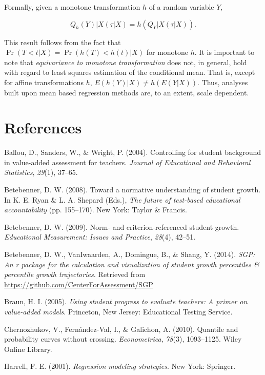 \documentclass[12pt]{article}
\begin{document}
Formally, given a monotone transformation \(h\) of a random variable
\(Y\),

\begin{equation} Q_ h(Y)|X (\tau | X) = h(Q_ Y|X (\tau | X)).\end{equation}

This result follows from the fact that
\(\Pr (T < t | X) = \Pr (h(T) < h(t) | X)\) for monotone \(h\). It is
important to note that \emph{equivariance to monotone transformation}
does not, in general, hold with regard to least squares estimation of
the conditional mean. That is, except for affine transformations \(h\),
\(E(h(Y)|X) \not= h(E(Y|X))\). Thus, analyses built upon mean based
regression methods are, to an extent, scale dependent.

\pagebreak

\section*{References}\label{references}

Ballou, D., Sanders, W., \& Wright, P. (2004). Controlling for student
background in value-added assessment for teachers. \emph{Journal of
Educational and Behavioral Statistics}, \emph{29}(1), 37--65.

Betebenner, D. W. (2008). Toward a normative understanding of student
growth. In K. E. Ryan \& L. A. Shepard (Eds.), \emph{The future of
test-based educational accountability} (pp. 155--170). New York: Taylor
\& Francis.

Betebenner, D. W. (2009). Norm- and criterion-referenced student growth.
\emph{Educational Measurement: Issues and Practice}, \emph{28}(4),
42--51.

Betebenner, D. W., {VanIwaarden}, A., Domingue, B., \& Shang, Y. (2014).
\emph{SGP: An r package for the calculation and visualization of student
growth percentiles \& percentile growth trajectories.} Retrieved from
\url{https://github.com/CenterForAssessment/SGP}

Braun, H. I. (2005). \emph{Using student progress to evaluate teachers:
A primer on value-added models}. Princeton, New Jersey: Educational
Testing Service.

Chernozhukov, V., Fern{á}ndez-Val, I., \& Galichon, A. (2010). Quantile
and probability curves without crossing. \emph{Econometrica},
\emph{78}(3), 1093--1125. Wiley Online Library.

Harrell, F. E. (2001). \emph{Regression modeling strategies}. New York:
Springer.
\end{document}
